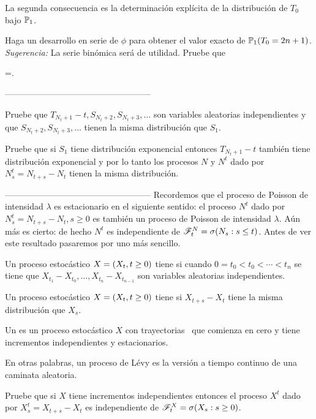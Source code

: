 La segunda consecuencia es la determinaci\'on expl\'icita de la distribuci\'on de $T_0$ bajo $ \mathbb{P} _1$.
\begin{ejercicio}
Haga un desarrollo en serie de $\phi$ para obtener el valor exacto de $ \mathbb{P} _1\!\left( T_0=2n+1\right) $. \emph{Sugerencia: } La serie bin\'omica ser\'a de utilidad. Pruebe que\begin{esn}
=.
\end{esn}
\end{ejercicio}
\pn---------------------------------------------------\pn
\begin{ejercicio}
Pruebe que $T_{N_t+1}-t,S_{N_t+2},S_{N_t+3},\ldots$ son variables aleatorias independientes y que $S_{N_t+2},S_{N_t+3},\ldots$ tienen la misma distribuci\'on que $S_1$. 

Pruebe que si $S_1$ tiene distribuci\'on exponencial entonces $T_{N_t+1}-t$ tambi\'en tiene distribuci\'on exponencial y por lo tanto los procesos $N$ y $N^t$ dado por $N^t_s=N_{t+s}-N_t$ tienen la misma distribuci\'on. 
\end{ejercicio}
\pn---------------------------------------------------\pn
Recordemos que el proceso de Poisson de intensidad $\lambda$ es estacionario en el siguiente sentido: el proceso $N^t$ dado por  $N^t_s=N_{t+s}-N_t,s\geq 0$ es tambi\'en un proceso de Poisson de intensidad $\lambda$. A\'un m\'as es cierto: de hecho $N^t$ es independiente de $\mathscr{F}^N_t=\sigma\!\left( N_s:s\leq t\right) $. Antes de ver este resultado pasaremos por uno m\'as sencillo.
\begin{definicion}
Un proceso estoc\'astico $X=\left( X_t,t\geq 0\right) $ tiene  si cuando $0=t_0<t_0<\cdots<t_n$ se tiene que $X_{t_1}-X_{t_0},\ldots, X_{t_{n}}-X_{t_{n-1}}$ son variables aleatorias independientes.

Un proceso estoc\'astico $X=\left( X_t,t\geq 0\right) $ tiene  si $X_{t+s}-X_t$ tiene la misma distribuci\'on que $X_s$. 

Un  es un proceso estoc\'astico $X$ con trayectorias \cadlag\ que comienza en cero y tiene incrementos independientes y estacionarios.
\end{definicion}
En otras palabras, un proceso de L\'evy es la versi\'on a tiempo continuo de una caminata aleatoria. 
\begin{ejercicio}
\label{IncrementosIndependientesImplicanIncrementosIndepDelPasadoEjercicio}
Pruebe que si $X$ tiene incrementos independientes entonces el proceso $X^t$ dado por $X^t_s=X_{t+s}-X_t$ es independiente de $\mathscr{F}^X_t=\sigma\!\left( X_s:s\geq 0\right) $.
\end{ejercicio}
